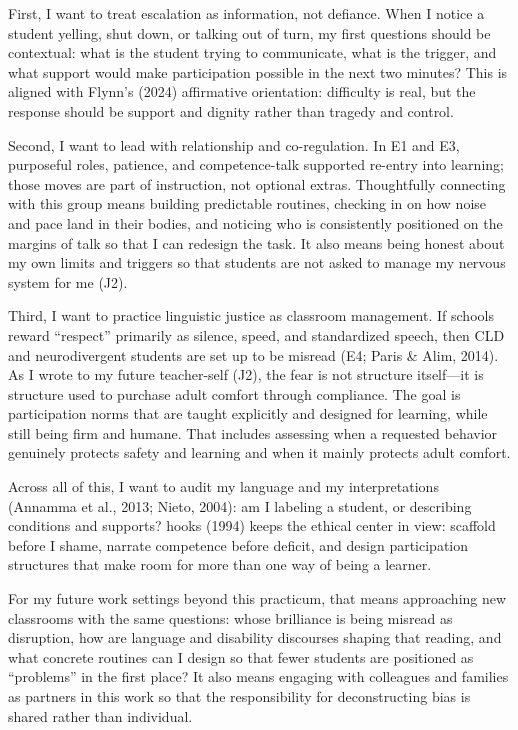 \documentclass[12pt]{article}
\newcommand{\EvidenceSet}[1]{\textsc{E#1}}
\newcommand{\JournalArtifact}[1]{\textsc{J#1}}
\begin{document}
First, I want to treat escalation as information, not defiance. When I notice a student yelling, shut down, or talking out of turn, my first questions should be contextual: what is the student trying to communicate, what is the trigger, and what support would make participation possible in the next two minutes? This is aligned with Flynn's (2024) affirmative orientation: difficulty is real, but the response should be support and dignity rather than tragedy and control.

Second, I want to lead with relationship and co-regulation. In \EvidenceSet{1} and \EvidenceSet{3}, purposeful roles, patience, and competence-talk supported re-entry into learning; those moves are part of instruction, not optional extras. Thoughtfully connecting with this group means building predictable routines, checking in on how noise and pace land in their bodies, and noticing who is consistently positioned on the margins of talk so that I can redesign the task. It also means being honest about my own limits and triggers so that students are not asked to manage my nervous system for me (\JournalArtifact{2}).

Third, I want to practice linguistic justice as classroom management. If schools reward ``respect'' primarily as silence, speed, and standardized speech, then CLD and neurodivergent students are set up to be misread (\EvidenceSet{4}; Paris \& Alim, 2014). As I wrote to my future teacher-self (\JournalArtifact{2}), the fear is not structure itself---it is structure used to purchase adult comfort through compliance. The goal is participation norms that are taught explicitly and designed for learning, while still being firm and humane. That includes assessing when a requested behavior genuinely protects safety and learning and when it mainly protects adult comfort.

Across all of this, I want to audit my language and my interpretations (Annamma et al., 2013; Nieto, 2004): am I labeling a student, or describing conditions and supports? hooks (1994) keeps the ethical center in view: scaffold before I shame, narrate competence before deficit, and design participation structures that make room for more than one way of being a learner.

For my future work settings beyond this practicum, that means approaching new classrooms with the same questions: whose brilliance is being misread as disruption, how are language and disability discourses shaping that reading, and what concrete routines can I design so that fewer students are positioned as ``problems'' in the first place? It also means engaging with colleagues and families as partners in this work so that the responsibility for deconstructing bias is shared rather than individual.
\end{document}
